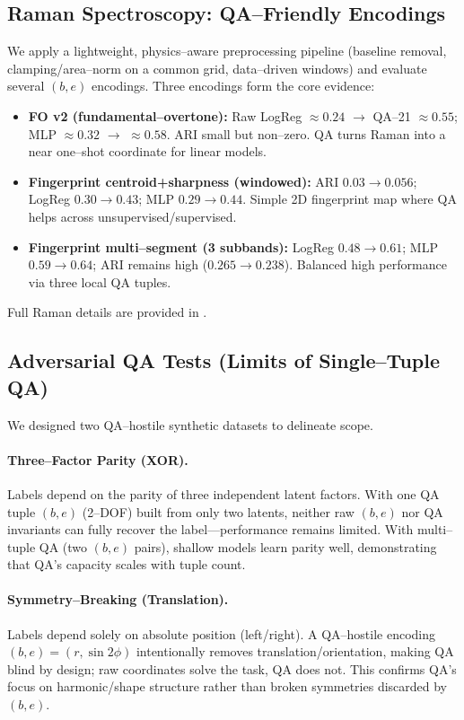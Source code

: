 \subsection{Raman Spectroscopy: QA–Friendly Encodings}

We apply a lightweight, physics–aware preprocessing pipeline (baseline removal, clamping/area–norm on a common grid, data–driven windows) and evaluate several \((b,e)\) encodings. Three encodings form the core evidence:
\begin{itemize}
  \item \textbf{FO v2 (fundamental–overtone):} Raw LogReg \(\approx 0.24\) \(\to\) QA–21 \(\approx 0.55\); MLP \(\approx 0.32\) \(\to\) \(\approx 0.58\). ARI small but non–zero. QA turns Raman into a near one–shot coordinate for linear models.
  \item \textbf{Fingerprint centroid+sharpness (windowed):} ARI \(0.03\to0.056\); LogReg \(0.30\to0.43\); MLP \(0.29\to0.44\). Simple 2D fingerprint map where QA helps across unsupervised/supervised.
  \item \textbf{Fingerprint multi–segment (3 subbands):} LogReg \(0.48\to0.61\); MLP \(0.59\to0.64\); ARI remains high (\(0.265\to0.238\)). Balanced high performance via three local QA tuples.
\end{itemize}
Full Raman details are provided in .

\subsection{Adversarial QA Tests (Limits of Single–Tuple QA)}

We designed two QA–hostile synthetic datasets to delineate scope.
\paragraph{Three–Factor Parity (XOR).} Labels depend on the parity of three independent latent factors. With one QA tuple \((b,e)\) (2–DOF) built from only two latents, neither raw \((b,e)\) nor QA invariants can fully recover the label—performance remains limited. With multi–tuple QA (two \((b,e)\) pairs), shallow models learn parity well, demonstrating that QA’s capacity scales with tuple count.
\paragraph{Symmetry–Breaking (Translation).} Labels depend solely on absolute position (left/right). A QA–hostile encoding \((b,e)=(r,\sin 2\phi)\) intentionally removes translation/orientation, making QA blind by design; raw coordinates solve the task, QA does not. This confirms QA’s focus on harmonic/shape structure rather than broken symmetries discarded by \((b,e)\).

